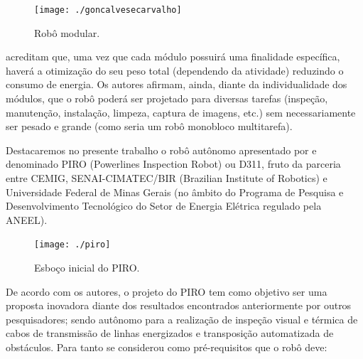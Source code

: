 \begin{figure} [h!]	
	\caption{Robô modular.}
	\label{img:goncalvesecarvalho}											 
	\centering													 
	\texttt{[image: ./goncalvesecarvalho]}
\end{figure}													 

 acreditam que, uma vez que cada módulo possuirá uma finalidade específica, haverá a otimização do seu peso total (dependendo da atividade) reduzindo o consumo de energia. Os autores afirmam, ainda, diante da individualidade dos módulos, que o robô poderá ser projetado para diversas tarefas (inspeção, manutenção, instalação, limpeza, captura de imagens, etc.) sem necessariamente ser pesado e grande (como seria um robô monobloco multitarefa). 


Destacaremos no presente trabalho o robô autônomo apresentado por  e  denominado PIRO (Powerlines Inspection Robot) ou D311, fruto da parceria entre CEMIG, SENAI-CIMATEC/BIR (Brazilian Institute of Robotics) e Universidade Federal de Minas Gerais (no âmbito do Programa de Pesquisa e Desenvolvimento Tecnológico do Setor de Energia Elétrica regulado pela ANEEL). 

\begin{figure} [h!]	
	\caption{Esboço inicial do PIRO.}
	\label{img:piro}											 
	\centering													 
	\texttt{[image: ./piro]}
\end{figure}													 

De acordo com os autores, o projeto do PIRO tem como objetivo ser uma proposta inovadora diante dos resultados encontrados anteriormente por outros pesquisadores; sendo autônomo para a realização de inspeção visual e térmica de cabos de transmissão de linhas energizados e transposição automatizada de obstáculos. Para tanto se considerou como pré-requisitos que o robô deve:

